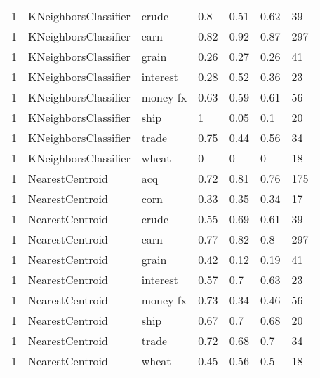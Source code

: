 \documentclass{article}
\begin{document}
\begin{table}[h]
\begin{tabular}{lllllll}
1             & KNeighborsClassifier   & crude           & 0.8                & 0.51            & 0.62              & 39               \\
1             & KNeighborsClassifier   & earn            & 0.82               & 0.92            & 0.87              & 297              \\
1             & KNeighborsClassifier   & grain           & 0.26               & 0.27            & 0.26              & 41               \\
1             & KNeighborsClassifier   & interest        & 0.28               & 0.52            & 0.36              & 23               \\
1             & KNeighborsClassifier   & money-fx        & 0.63               & 0.59            & 0.61              & 56               \\
1             & KNeighborsClassifier   & ship            & 1                  & 0.05            & 0.1               & 20               \\
1             & KNeighborsClassifier   & trade           & 0.75               & 0.44            & 0.56              & 34               \\
1             & KNeighborsClassifier   & wheat           & 0                  & 0               & 0                 & 18               \\
1             & NearestCentroid        & acq             & 0.72               & 0.81            & 0.76              & 175              \\
1             & NearestCentroid        & corn            & 0.33               & 0.35            & 0.34              & 17               \\
1             & NearestCentroid        & crude           & 0.55               & 0.69            & 0.61              & 39               \\
1             & NearestCentroid        & earn            & 0.77               & 0.82            & 0.8               & 297              \\
1             & NearestCentroid        & grain           & 0.42               & 0.12            & 0.19              & 41               \\
1             & NearestCentroid        & interest        & 0.57               & 0.7             & 0.63              & 23               \\
1             & NearestCentroid        & money-fx        & 0.73               & 0.34            & 0.46              & 56               \\
1             & NearestCentroid        & ship            & 0.67               & 0.7             & 0.68              & 20               \\
1             & NearestCentroid        & trade           & 0.72               & 0.68            & 0.7               & 34               \\
1             & NearestCentroid        & wheat           & 0.45               & 0.56            & 0.5               & 18               \end{tabular}
\end{table}
\end{document}
